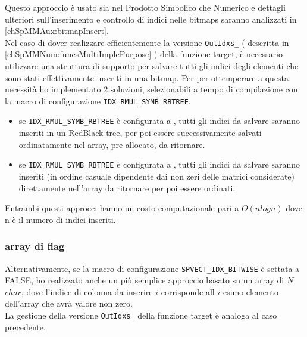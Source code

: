 Questo approccio è usato sia nel Prodotto Simbolico che Numerico e dettagli ulteriori sull'inserimento e controllo 
di indici nelle bitmaps saranno analizzati in \ref{chSpMMAux:bitmapInsert}.\\
Nel caso di dover realizzare efficientemente la versione \verb|OutIdxs_| ( descritta in \ref{chSpMMNum:funcsMultiImplePurpose} )
della funzione target, è necessario utilizzare una struttura di supporto per salvare tutti gli indici degli elementi \nnz
 che sono stati effettivamente inseriti in una bitmap.
Per per ottemperare a questa necessità ho implementato 2 soluzioni, selezionabili a tempo di compilazione con
la macro di configurazione \verb|IDX_RMUL_SYMB_RBTREE|.\\
\begin{itemize}
	\item se \verb|IDX_RMUL_SYMB_RBTREE| è configurata a , tutti gli indici da salvare saranno 
		  inseriti in un RedBlack tree, per poi essere successivamente salvati ordinatamente nel array, pre allocato, 
		  da ritornare.
	\item se \verb|IDX_RMUL_SYMB_RBTREE| è configurata a , tutti gli indici da salvare saranno inseriti
		  (in ordine casuale dipendente dai non zeri delle matrici considerate) direttamente nell'array da ritornare
		  per poi essere ordinati.
\end{itemize}
Entrambi questi approcci hanno un costo computazionale pari a $O(n log n)$ dove n è il numero di indici inseriti.\\

\subsubsection{array di flag}
Alternativamente, se la macro di configurazione \verb|SPVECT_IDX_BITWISE| è settata a FALSE, 
ho realizzato anche un più semplice approccio basato su un array di $N$ $char$, 
dove l'indice di colonna da inserire $i$ corrisponde all $i$-esimo elemento dell'array che avrà valore non zero.\\
La gestione della versione \verb|OutIdxs_| della funzione target è analoga al caso precedente.\\  %

